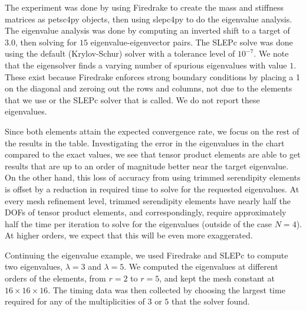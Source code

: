 \documentclass[format=acmsmall,screen,timestamp=false,a4paper]{acmart}
\begin{document}
The experiment was done by using Firedrake to create the mass and stiffness matrices as petsc4py objects, then using slepc4py to do the eigenvalue analysis.  The eigenvalue analysis was done by computing an inverted shift to a target of $3.0$, then solving for $15$ eigenvalue-eigenvector pairs.  The SLEPc solve was done using the default (Krylov-Schur) solver with a tolerance level of $10^{-7}$.
We note that the eigensolver finds a varying number of spurious eigenvalues with value $1$.  These exist because Firedrake enforces strong boundary conditions by placing a 1 on the diagonal and zeroing out the rows and columns, not due to the elements that we use or the SLEPc solver that is called.  We do not report these eigenvalues.

Since both elements attain the expected convergence rate, we focus on the rest of the results in the table.  Investigating the error in the eigenvalues in the chart compared to the exact values, we see that tensor product elements are able to get results that are up to an order of magnitude better near the target eigenvalue.  On the other hand, this loss of accuracy from using trimmed serendipity elements is offset by a reduction in required time to solve for the requested eigenvalues.  At every mesh refinement level, trimmed serendipity elements have nearly half the DOFs of tensor product elements, and correspondingly, require approximately half the time per iteration to solve for the eigenvalues (outside of the case $N=4$).  At higher orders, we expect that this will be even more exaggerated.  

Continuing the eigenvalue example, we used Firedrake and SLEPc to compute two eigenvalues, $\lambda = 3$ and $\lambda = 5$. We computed the eigenvalues at different orders of the elements, from $r=2$ to $r=5$, and kept the mesh constant at $16 \times 16 \times 16$.  The timing data was then collected by choosing the largest time required for any of the multiplicities of $3$ or $5$ that the solver found. 
\end{document}
